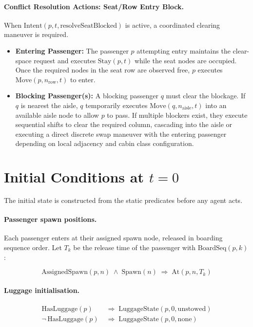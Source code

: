 \documentclass[11pt,a4paper]{article}
\begin{document}
\paragraph{Conflict Resolution Actions: Seat/Row Entry Block.}
When $\text{Intent}(p,t,\text{resolveSeatBlocked})$ is active, a coordinated clearing maneuver is required.
\begin{itemize}
    \item \textbf{Entering Passenger:} The passenger $p$ attempting entry maintains the clear-space request and executes $\text{Stay}(p,t)$ while the seat nodes are occupied. Once the required nodes in the seat row are observed free, $p$ executes $\text{Move}(p,n_{\text{row}},t)$ to enter.
    \item \textbf{Blocking Passenger(s):} A blocking passenger $q$ must clear the blockage. If $q$ is nearest the aisle, $q$ temporarily executes $\text{Move}(q,n_{\text{aisle}},t)$ into an available aisle node to allow $p$ to pass. If multiple blockers exist, they execute sequential shifts to clear the required column, cascading into the aisle or executing a direct discrete swap maneuver with the entering passenger depending on local adjacency and cabin class configuration.
\end{itemize}

\section{Initial Conditions at $t = 0$}

The initial state is constructed from the static predicates before any agent acts.

\paragraph{Passenger spawn positions.}
Each passenger enters at their assigned spawn node, released in boarding sequence order.
Let $T_k$ be the release time of the passenger with $\text{BoardSeq}(p,k)$:

\begin{equation}
  \text{AssignedSpawn}(p,n) \;\wedge\; \text{Spawn}(n)
  \;\Rightarrow\; \text{At}(p,n,T_k)
  \label{eq:spawn}
\end{equation}

\paragraph{Luggage initialisation.}
\begin{align}
  \text{HasLuggage}(p) &\;\Rightarrow\; \text{LuggageState}(p,0,\text{unstowed}) \\
  \neg\,\text{HasLuggage}(p) &\;\Rightarrow\; \text{LuggageState}(p,0,\text{none})
\end{align}
\end{document}
